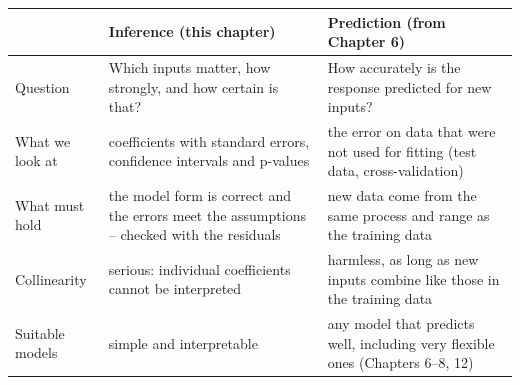 \documentclass[
  letterpaper,
  DIV=11,
  numbers=noendperiod]{scrreprt}
\begin{document}
\begin{tcolorbox}[enhanced jigsaw, left=2mm, title=\textcolor{quarto-callout-important-color}{\faExclamation}\hspace{0.5em}{Two uses of the same model}, opacityback=0, breakable, rightrule=.15mm, arc=.35mm, toptitle=1mm, colbacktitle=quarto-callout-important-color!10!white, opacitybacktitle=0.6, coltitle=black, colframe=quarto-callout-important-color-frame, bottomrule=.15mm, leftrule=.75mm, bottomtitle=1mm, titlerule=0mm, toprule=.15mm, colback=white]

\begin{longtable}[]{@{}
  >{\raggedright\arraybackslash}p{}
  >{\raggedright\arraybackslash}p{}
  >{\raggedright\arraybackslash}p{}@{}}
\toprule\noalign{}
\begin{minipage}[b]{\linewidth}\raggedright
\end{minipage} & \begin{minipage}[b]{\linewidth}\raggedright
Inference (this chapter)
\end{minipage} & \begin{minipage}[b]{\linewidth}\raggedright
Prediction (from Chapter 6)
\end{minipage} \\
\midrule\noalign{}
\endhead
\bottomrule\noalign{}
\endlastfoot
Question & Which inputs matter, how strongly, and how certain is that? &
How accurately is the response predicted for new inputs? \\
What we look at & coefficients with standard errors, confidence
intervals and p-values & the error on data that were not used for
fitting (test data, cross-validation) \\
What must hold & the model form is correct and the errors meet the
assumptions -- checked with the residuals & new data come from the same
process and range as the training data \\
Collinearity & serious: individual coefficients cannot be interpreted &
harmless, as long as new inputs combine like those in the training
data \\
Suitable models & simple and interpretable & any model that predicts
well, including very flexible ones (Chapters 6--8, 12) \\
\end{longtable}

\end{tcolorbox}
\end{document}

